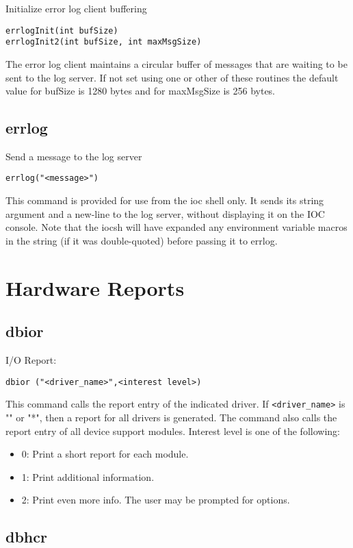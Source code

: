Initialize error log client buffering

\begin{verbatim}errlogInit(int bufSize)
errlogInit2(int bufSize, int maxMsgSize)
\end{verbatim}The error log client maintains a circular buffer of messages that are waiting to be sent to the log server.  If not set using 
one or other of these routines the default value for bufSize is 1280 bytes and for maxMsgSize is 256 bytes.

\subsection{errlog}

Send a message to the log server

\begin{verbatim}errlog("<message>")
\end{verbatim}This command is provided for use from the ioc shell only.  It sends its string argument and a new-line to the log server, 
without displaying it on the IOC console. Note that the iocsh will have expanded any environment variable macros in the 
string (if it was double-quoted) before passing it to errlog.

\section{Hardware Reports}

\subsection{dbior}

I/O Report:

\begin{verbatim}dbior ("<driver_name>",<interest level>)
\end{verbatim}This command calls the report entry of the indicated driver. If \verb|<driver_name>| is "" or "*", then a report for all drivers 
is generated. The command also calls the report entry of all device support modules. Interest level is one of the following:

\begin{itemize}\item 0: Print a short report for each module.

\item 1:  Print additional information.

\item 2:  Print even more info. The user may be prompted for options.

\end{itemize}\subsection{dbhcr}

